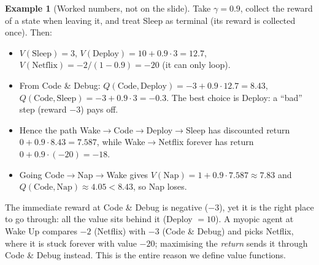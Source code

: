 \documentclass[11pt,a4paper]{article}
\theoremstyle{plain}
\theoremstyle{definition}
\newtheorem{example}[theorem]{Example}
\theoremstyle{remark}
\begin{document}
\begin{example}[Worked numbers, not on the slide]
Take $\gamma=0.9$, collect the reward of a state when leaving it, and treat Sleep as terminal (its reward is collected once). Then:
\begin{itemize}[nosep]
 \item $V(\text{Sleep})=3$, $V(\text{Deploy})=10+0.9\cdot3=12.7$, $V(\text{Netflix})=-2/(1-0.9)=-20$ (it can only loop).
 \item From Code \& Debug: $Q(\text{Code},\text{Deploy})=-3+0.9\cdot12.7=8.43$, $Q(\text{Code},\text{Sleep})=-3+0.9\cdot3=-0.3$. The best choice is Deploy: a ``bad'' step (reward $-3$) pays off.
 \item Hence the path Wake$\to$Code$\to$Deploy$\to$Sleep has discounted return $0+0.9\cdot8.43=7.587$, while Wake$\to$Netflix forever has return $0+0.9\cdot(-20)=-18$.
 \item Going Code$\to$Nap$\to$Wake gives $V(\text{Nap})=1+0.9\cdot7.587\approx7.83$ and $Q(\text{Code},\text{Nap})\approx4.05<8.43$, so Nap loses.
\end{itemize}
\end{example}

\begin{intuition}
The immediate reward at Code \& Debug is negative ($-3$), yet it is the right place to go through: all the value sits behind it (Deploy $=10$). A myopic agent at Wake Up compares $-2$ (Netflix) with $-3$ (Code \& Debug) and picks Netflix, where it is stuck forever with value $-20$; maximising the \emph{return} sends it through Code \& Debug instead. This is the entire reason we define value functions.
\end{intuition}

\end{document}
